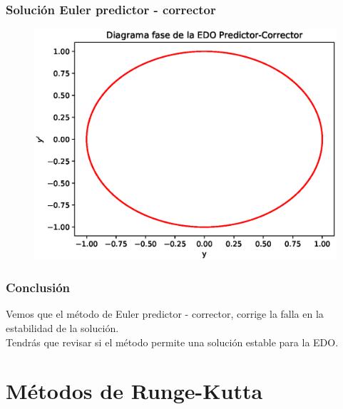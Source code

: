 \begin{frame}[plain]
\frametitle{Solución Euler predictor - corrector}
\begin{figure}
	\centering
	\includegraphics[scale=0.65]{Imagenes/solucion_euler_pc_02.eps}
\end{figure}
\end{frame}
\begin{frame}
\frametitle{Conclusión}
Vemos que el método de Euler predictor - corrector, corrige la falla en la estabilidad de la solución.
\\
\bigskip
Tendrás que revisar si el método permite una solución estable para la EDO.
\end{frame}
\section{Métodos de Runge-Kutta}
